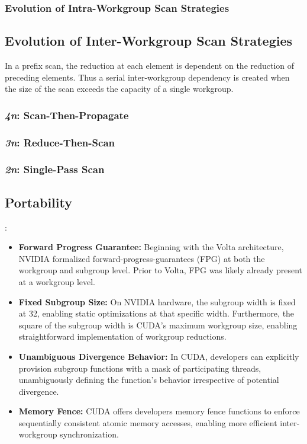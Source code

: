 \documentclass[sigconf]{acmart}
\begin{document}
\subsubsection{Evolution of Intra-Workgroup Scan Strategies}

\subsection{Evolution of Inter-Workgroup Scan Strategies}
In a prefix scan, the reduction at each element is dependent on the reduction of preceding elements. Thus a serial inter-workgroup dependency is created when the size of the scan exceeds the capacity of a single workgroup.

\subsubsection{\emph{4n}: Scan-Then-Propagate}
\cite{Sengupta2008, 10.5555/1280094.1280110, GPUGems3}
\subsubsection{\emph{3n}: Reduce-Then-Scan}
\cite{Merrill2009, 10.5555/110382.110597, 10.1145/1375527.1375559}
\subsubsection{\emph{2n}: Single-Pass Scan}
\cite{10.1145/2442516.2442539,Merrill2016}
\subsection{Portability}
\cite{sorensen_et_al:LIPIcs.CONCUR.2018.23, 10.1145/3485508, NvidiaCudaGuide, NvidiaVoltaWhitepaper}:
\begin{itemize}
  \item \textbf{Forward Progress Guarantee:} Beginning with the Volta architecture, NVIDIA formalized forward-progress-guarantees (FPG) at both the workgroup and subgroup level. Prior to Volta, FPG was likely already present at a workgroup level.
  \item \textbf{Fixed Subgroup Size:} On NVIDIA hardware, the subgroup width is fixed at 32, enabling static optimizations at that specific width. Furthermore, the square of the subgroup width is CUDA's maximum workgroup size, enabling straightforward implementation of workgroup reductions.
  \item \textbf{Unambiguous Divergence Behavior:} In CUDA, developers can explicitly provision subgroup functions with a mask of participating threads, unambiguously defining the function's behavior irrespective of potential divergence.
  \item \textbf{Memory Fence:} CUDA offers developers memory fence functions to enforce sequentially consistent atomic memory accesses, enabling more efficient inter-workgroup synchronization.
\end{itemize}
\end{document}

